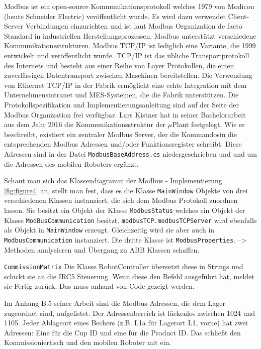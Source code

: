 Modbus ist ein open-source Kommunikationsprotokoll welches 1979 von Modicon (heute Schneider Electric) veröffentlicht wurde.
Es wird dazu verwendet Client-Server Verbindungen einzurichten und ist laut Modbus Organization de facto Standard in
industriellen Herstellungsprozessen.
Modbus unterstützt verschiedene Kommunikationsstrukturen.
Modbus TCP/IP ist lediglich eine Variante, die 1999 entwickelt und veröffentlicht wurde.
TCP/IP ist das übliche Transportprotokoll des Internets und besteht aus einer Reihe von Layer Protokollen, die einen
zuverlässigen Datentransport zwischen Maschinen bereitstellen.
Die Verwendung von Ethernet TCP/IP in der Fabrik ermöglicht eine echte Integration mit dem Unternehmensintranet und
MES-Systemen, die die Fabrik unterstützen.
Die Protokollspezifikation und Implementierungsanleitung sind auf der Seite der Modbus Organization frei verfügbar\cite{ModbusOrg}.
\newline
\newline
Lars Kistner \cite{LarsKistner2017} hat in seiner Bachelorarbeit aus dem Jahr 2016 die Kommunikationsstruktur der $\mu$Plant
festgelegt.
Wie er beschreibt, existiert ein zentraler Modbus Server, der die \glqq Kommandos\grqq in die entsprechenden Modbus
Adressen und/oder Funktionsregister schreibt.
Diese Adressen sind in der Datei \verb|ModbusBaseAddress.cs| niedergeschrieben und und um die Adressen des mobilen Roboters
ergänzt.

Schaut man sich das Klassendiagramm der Modbus - Implementierung \ref{fig:figure4} an, stellt man fest, dass es die Klasse
\verb|MainWindow| Objekte von drei verschiedenen Klassen instanziert, die sich dem Modbus Protokoll zuordnen lassen.
Sie besitzt ein Objekt der Klasse \verb|ModbusStatus| welches ein Objekt der Klasse \verb|ModBusCommunication| besitzt.
\verb|modbusTCP.modbusTCPServer| wird ebenfalls als Objekt in \verb|MainWindow| erzeugt.
Gleichzeitig wird sie aber auch in \verb|ModbusCommunication| instanziert.
Die dritte Klasse ist \verb|ModbusProperties|.
--> Methoden analysieren und Übergang zu ABB Klassen schaffen.

\verb|CommissionMatrix|
Die Klasse RobotController übersetzt diese in Strings und schickt sie an die IRC5 Steuerung.
Wenn diese den Befehl ausgeführt hat, meldet sie \glqq Fertig \grqq zurück.
Das muss anhand von Code gezeigt werden.

Im Anhang B.5 seiner Arbeit sind die Modbus-Adressen, die dem Lager zugeordnet sind, aufgelistet.
Der Adressenbereich ist lückenlos zwischen 1024 und 1105.
Jeder Ablageort eines Bechers (z.B. L1a für Lagerort L1, vorne) hat zwei Adressen: Eine für die Cup ID und eine
für die Product ID.
Das schließt den Kommissioniertisch und den mobilen Roboter mit ein.

